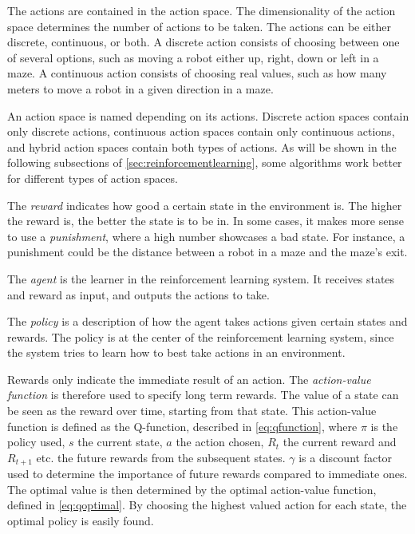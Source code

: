 \documentclass{kththesis}
\begin{document}
The actions are contained in the action space. The dimensionality of the action space determines the number of actions to be taken. The actions can be either discrete, continuous, or both. A discrete action consists of choosing between one of several options, such as moving a robot either up, right, down or left in a maze. A continuous action consists of choosing real values, such as how many meters to move a robot in a given direction in a maze.

An action space is named depending on its actions. Discrete action spaces contain only discrete actions, continuous action spaces contain only continuous actions, and hybrid action spaces contain both types of actions. As will be shown in the following subsections of \autoref{sec:reinforcementlearning}, some algorithms work better for different types of action spaces.

The \textit{reward} indicates how good a certain state in the environment is. The higher the reward is, the better the state is to be in. In some cases, it makes more sense to use a \textit{punishment}, where a high number showcases a bad state. For instance, a punishment could be the distance between a robot in a maze and the maze's exit. 

The \textit{agent} is the learner in the reinforcement learning system. It receives states and reward as input, and outputs the actions to take.

The \textit{policy} is a description of how the agent takes actions given certain states and rewards. The policy is at the center of the reinforcement learning system, since the system tries to learn how to best take actions in an environment. \parencite{sutton1998introduction}

Rewards only indicate the immediate result of an action. The \textit{action-value function} is therefore used to specify long term rewards. The value of a state can be seen as the reward over time, starting from that state. This action-value function is defined as the Q-function, described in \autoref{eq:qfunction}, where $\pi$ is the policy used, $s$ the current state, $a$ the action chosen, $R_t$ the current reward and $R_{t+1}$ etc. the future rewards from the subsequent states. $\gamma$ is a discount factor used to determine the importance of future rewards compared to immediate ones. The optimal value is then determined by the optimal action-value function, defined in \autoref{eq:qoptimal}. By choosing the highest valued action for each state, the optimal policy is easily found. \parencite{van2016deep}
\end{document}
